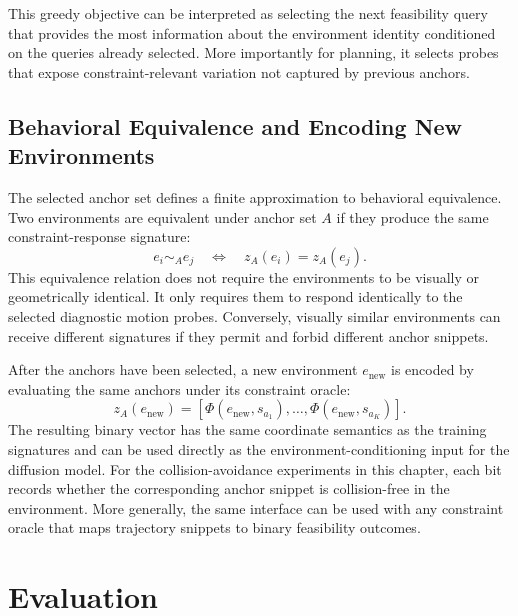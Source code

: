 This greedy objective can be interpreted as selecting the next feasibility query that provides the most information about the environment identity conditioned on the queries already selected. More importantly for planning, it selects probes that expose constraint-relevant variation not captured by previous anchors.

\subsection{Behavioral Equivalence and Encoding New Environments}

The selected anchor set defines a finite approximation to behavioral equivalence. Two environments are equivalent under anchor set $A$ if they produce the same constraint-response signature:
%
\begin{equation}
e_i \sim_A e_j
\quad\Longleftrightarrow\quad
z_A(e_i)=z_A(e_j).
\end{equation}
%
This equivalence relation does not require the environments to be visually or geometrically identical. It only requires them to respond identically to the selected diagnostic motion probes. Conversely, visually similar environments can receive different signatures if they permit and forbid different anchor snippets.

After the anchors have been selected, a new environment $e_{\mathrm{new}}$ is encoded by evaluating the same anchors under its constraint oracle:
%
\begin{equation}
z_A(e_{\mathrm{new}})
=
\left[
\Phi(e_{\mathrm{new}},s_{a_1}),
\ldots,
\Phi(e_{\mathrm{new}},s_{a_K})
\right].
\end{equation}
%
The resulting binary vector has the same coordinate semantics as the training signatures and can be used directly as the environment-conditioning input for the diffusion model. For the collision-avoidance experiments in this chapter, each bit records whether the corresponding anchor snippet is collision-free in the environment. More generally, the same interface can be used with any constraint oracle that maps trajectory snippets to binary feasibility outcomes.


\section{Evaluation}\label{sec:evaluation}

